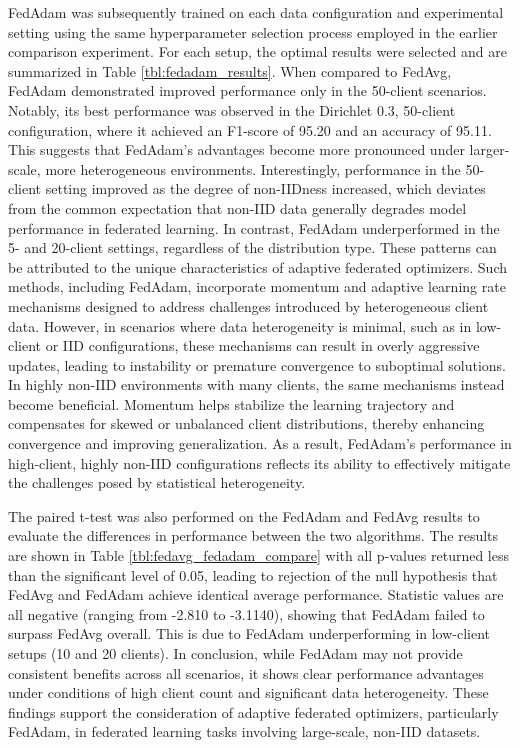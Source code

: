 FedAdam was subsequently trained on each data configuration and experimental setting using the same hyperparameter selection process employed in the earlier comparison experiment. For each setup, the optimal results were selected and are summarized in Table \ref{tbl:fedadam_results}. When compared to FedAvg, FedAdam demonstrated improved performance only in the 50-client scenarios. Notably, its best performance was observed in the Dirichlet 0.3, 50-client configuration, where it achieved an F1-score of 95.20 and an accuracy of 95.11. This suggests that FedAdam’s advantages become more pronounced under larger-scale, more heterogeneous environments. Interestingly, performance in the 50-client setting improved as the degree of non-IIDness increased, which deviates from the common expectation that non-IID data generally degrades model performance in federated learning. In contrast, FedAdam underperformed in the 5- and 20-client settings, regardless of the distribution type. These patterns can be attributed to the unique characteristics of adaptive federated optimizers. Such methods, including FedAdam, incorporate momentum and adaptive learning rate mechanisms designed to address challenges introduced by heterogeneous client data. However, in scenarios where data heterogeneity is minimal, such as in low-client or IID configurations, these mechanisms can result in overly aggressive updates, leading to instability or premature convergence to suboptimal solutions. In highly non-IID environments with many clients, the same mechanisms instead become beneficial. Momentum helps stabilize the learning trajectory and compensates for skewed or unbalanced client distributions, thereby enhancing convergence and improving generalization. As a result, FedAdam's performance in high-client, highly non-IID configurations reflects its ability to effectively mitigate the challenges posed by statistical heterogeneity.

The paired t-test was also performed on the FedAdam and FedAvg results to evaluate the differences in performance between the two algorithms. The results are shown in Table \ref{tbl:fedavg_fedadam_compare} with all p-values returned less than the significant level of 0.05, leading to rejection of the null hypothesis that FedAvg and FedAdam achieve identical average performance. Statistic values are all negative (ranging from -2.810 to -3.1140), showing that FedAdam failed to surpass FedAvg overall. This is due to FedAdam underperforming in low-client setups (10 and 20 clients). In conclusion, while FedAdam may not provide consistent benefits across all scenarios, it shows clear performance advantages under conditions of high client count and significant data heterogeneity. These findings support the consideration of adaptive federated optimizers, particularly FedAdam, in federated learning tasks involving large-scale, non-IID datasets.


